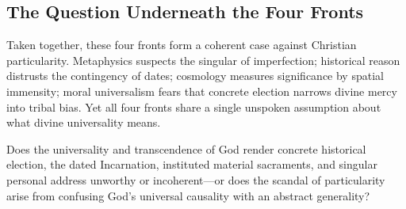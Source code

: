 \subsection{The Question Underneath the Four Fronts}

Taken together, these four fronts form a coherent case against Christian particularity. Metaphysics suspects the singular of imperfection; historical reason distrusts the contingency of dates; cosmology measures significance by spatial immensity; moral universalism fears that concrete election narrows divine mercy into tribal bias. Yet all four fronts share a single unspoken assumption about what divine universality means.

Does the universality and transcendence of God render concrete historical election, the dated Incarnation, instituted material sacraments, and singular personal address unworthy or incoherent---or does the scandal of particularity arise from confusing God's universal causality with an abstract generality?
